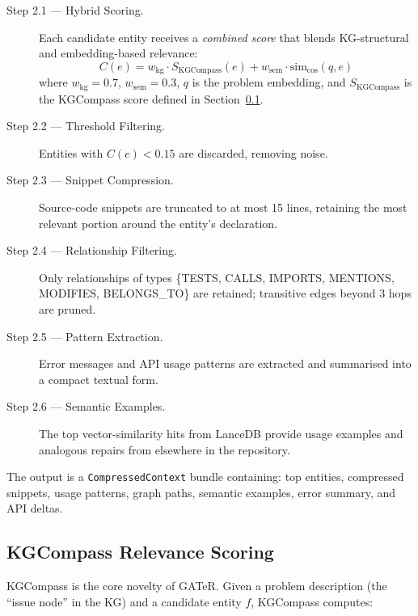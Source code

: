 \documentclass[conference,10pt]{IEEEtran}
\begin{document}
\begin{description}
    \item[Step 2.1 --- Hybrid Scoring.]
    Each candidate entity receives a \emph{combined score} that blends
    KG-structural and embedding-based relevance:
    \begin{equation}
        C(e) = w_{\text{kg}} \cdot S_{\text{KGCompass}}(e)
             + w_{\text{sem}} \cdot \text{sim}_{\text{cos}}(q, e)
    \end{equation}
    where $w_{\text{kg}} = 0.7$, $w_{\text{sem}} = 0.3$, $q$ is the
    problem embedding, and $S_{\text{KGCompass}}$ is the KGCompass score
    defined in Section~\ref{sec:kgcompass}.

    \item[Step 2.2 --- Threshold Filtering.]
    Entities with $C(e) < 0.15$ are discarded, removing noise.

    \item[Step 2.3 --- Snippet Compression.]
    Source-code snippets are truncated to at most 15 lines, retaining
    the most relevant portion around the entity's declaration.

    \item[Step 2.4 --- Relationship Filtering.]
    Only relationships of types \{TESTS, CALLS, IMPORTS, MENTIONS,
    MODIFIES, BELONGS\_TO\} are retained; transitive edges beyond
    3 hops are pruned.

    \item[Step 2.5 --- Pattern Extraction.]
    Error messages and API usage patterns are extracted and summarised
    into a compact textual form.

    \item[Step 2.6 --- Semantic Examples.]
    The top vector-similarity hits from LanceDB provide usage examples
    and analogous repairs from elsewhere in the repository.
\end{description}

The output is a \texttt{CompressedContext} bundle containing: top
entities, compressed snippets, usage patterns, graph paths, semantic
examples, error summary, and API deltas.

\subsection{KGCompass Relevance Scoring}
\label{sec:kgcompass}

KGCompass is the core novelty of GATeR. Given a problem description
(the ``issue node'' in the KG) and a candidate entity $f$, KGCompass
computes:
\end{document}
